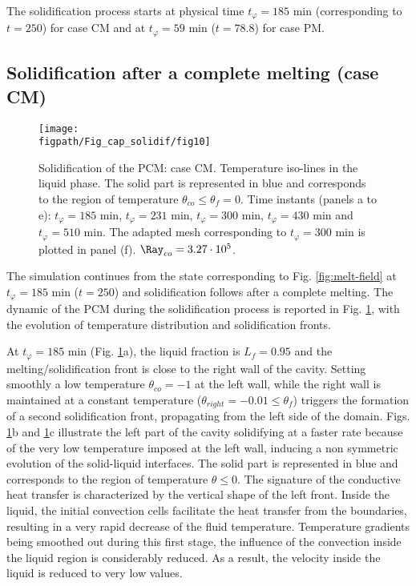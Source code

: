 \noindent The solidification process starts at physical time $t_{\varphi} = 185 $ min (corresponding to $t = 250 $) for case CM and at $t_{\varphi} = 59$ min ($t = 78.8 $) for case PM. 

\newpage
\subsection{Solidification after a complete melting (case CM)} \label{sec_solid_full} 

\begin{figure}
	\begin{center}
		\texttt{[image: \\figpath/Fig\_cap\_solidif/fig10]}
	\end{center}
	\caption{Solidification of the PCM: case CM. 
	Temperature iso-lines in the liquid phase. 
	The solid part is represented in blue and corresponds to the region of temperature $\theta_{co} \leq \theta_f=0$. 
	Time instants (panels  a to e): $t_{\varphi} = 185$ min, $t_{\varphi} = 231$ min, $t_{\varphi} = 300$ min, $t_{\varphi} = 430$ min and $t_{\varphi} = 510$ min. 
	The adapted mesh corresponding to $t_{\varphi} = 300$ min is plotted in panel (f).  $\Ray_{co}=3.27 \cdot 10^5$. }\label{fig:evolution}
\end{figure}

The simulation continues from the state corresponding to Fig.  \ref{fig:melt-field} at $t_{\varphi} =185$ min ($t=250$) and solidification follows after a complete melting. 
The dynamic of the PCM during the solidification process is reported in Fig. \ref{fig:evolution}, with the evolution of temperature distribution and solidification fronts.

At  $t_{\varphi}  =185$ min     (Fig. \ref{fig:evolution}a), the liquid fraction is $L_f=0.95$ and the melting/solidification front is close to the right wall of the cavity. 
Setting smoothly a low temperature $\theta_{co} = -1$ at the left wall, while the right wall is maintained at a constant temperature ($\theta_{right} = -0.01 \leq \theta_f$) triggers the formation of a second solidification front, propagating from the left side of the domain. 
Figs. \ref{fig:evolution}b and \ref{fig:evolution}c illustrate the left part of the cavity solidifying at a faster rate because of the very low temperature imposed at the left wall, inducing a non symmetric evolution of the solid-liquid interfaces.
The solid part is represented in blue and corresponds to the region of temperature $\theta \leq 0$.
The signature of the conductive heat transfer is characterized by the vertical shape of the left front.
Inside the liquid, the initial convection cells facilitate the heat transfer from the boundaries, resulting in a very rapid decrease of the fluid temperature. 
Temperature gradients being smoothed out during this first stage, the influence of the convection inside the liquid region is considerably reduced. As a result, the velocity inside the liquid is reduced to very low values. 

